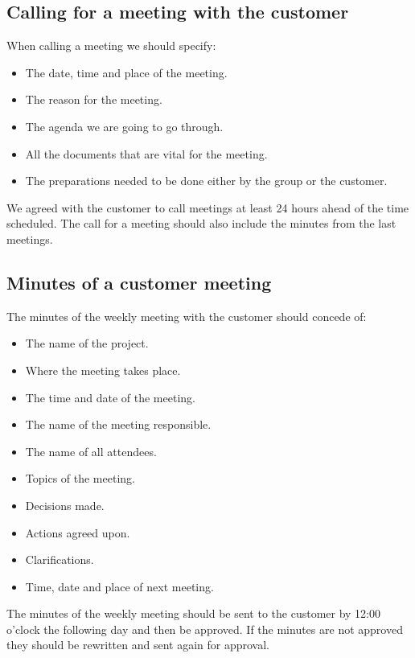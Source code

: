 \subsection{Calling for a meeting with the customer}
When calling a meeting we should specify:
\begin{itemize}
\item{}The date, time and place of the meeting.
\item{}The reason for the meeting.
\item{}The agenda we are going to go through.
\item{}All the documents that are vital for the meeting.
\item{}The preparations needed to be done either by the group or the customer.
\end{itemize}
We agreed with the customer to call meetings at least 24 hours ahead of the time scheduled. The call for a meeting should also include the minutes from the last meetings. 

\subsection{Minutes of a customer meeting}
The minutes of the weekly meeting with the customer should concede of:
\begin{itemize}
\item{}The name of the project.
\item{}Where the meeting takes place.
\item{}The time and date of the meeting.
\item{}The name of the meeting responsible.
\item{}The name of all attendees.
\item{}Topics of the meeting.
\item{}Decisions made.
\item{}Actions agreed upon.
\item{}Clarifications.
\item{}Time, date and place of next meeting.
\end{itemize}
The minutes of the weekly meeting should be sent to the customer by 12:00 o’clock the following day and then be approved. If the minutes are not approved they should be rewritten and sent again for approval. 

